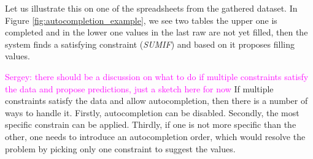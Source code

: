 \documentclass{IEEEtran}
\newcommand{\sergey}[1]{\textcolor{magenta}{{\sc Sergey:} #1}\xspace}
\theoremstyle{definition}
\begin{document}
Let us illustrate this on one of the spreadsheets from the gathered dataset. In Figure \ref{fig:autocompletion_example}, we see two tables the upper one is completed and in the lower one values in the last raw are not yet filled, then the system finds a satisfying constraint (\textit{SUMIF}) and based on it proposes filling values.

\sergey{there should be a discussion on what to do if multiple constraints satisfy the data and propose predictions, just a sketch here for now}
If multiple constraints satisfy the data and allow autocompletion, then there is a number of ways to handle it. Firstly, autocompletion can be disabled. Secondly, the most specific constrain can be applied. Thirdly, if one is not more specific than the other, one needs to introduce an autocompletion order, which would resolve the problem by picking only one constraint to suggest the values.
\end{document}
